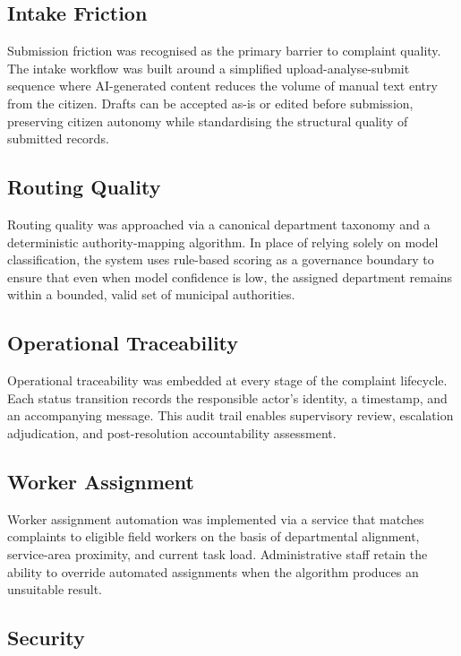 \subsection{Intake Friction}

Submission friction was recognised as the primary barrier to complaint quality. The intake workflow was built around a simplified upload-analyse-submit sequence where AI-generated content reduces the volume of manual text entry from the citizen. Drafts can be accepted as-is or edited before submission, preserving citizen autonomy while standardising the structural quality of submitted records.

\subsection{Routing Quality}

Routing quality was approached via a canonical department taxonomy and a deterministic authority-mapping algorithm. In place of relying solely on model classification, the system uses rule-based scoring as a governance boundary to ensure that even when model confidence is low, the assigned department remains within a bounded, valid set of municipal authorities.

\subsection{Operational Traceability}

Operational traceability was embedded at every stage of the complaint lifecycle. Each status transition records the responsible actor's identity, a timestamp, and an accompanying message. This audit trail enables supervisory review, escalation adjudication, and post-resolution accountability assessment.

\subsection{Worker Assignment}

Worker assignment automation was implemented via a service that matches complaints to eligible field workers on the basis of departmental alignment, service-area proximity, and current task load. Administrative staff retain the ability to override automated assignments when the algorithm produces an unsuitable result.

\subsection{Security}

